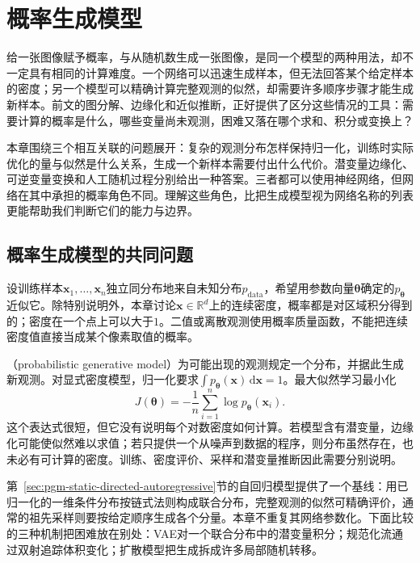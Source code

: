 \chapter{概率生成模型}
\label{chap:pgm-generative}

给一张图像赋予概率，与从随机数生成一张图像，是同一个模型的两种用法，却不一定具有相同的计算难度。一个网络可以迅速生成样本，但无法回答某个给定样本的密度；另一个模型可以精确计算完整观测的似然，却需要许多顺序步骤才能生成新样本。前文的图分解、边缘化和近似推断，正好提供了区分这些情况的工具：需要计算的概率是什么，哪些变量尚未观测，困难又落在哪个求和、积分或变换上？

本章围绕三个相互关联的问题展开：复杂的观测分布怎样保持归一化，训练时实际优化的量与似然是什么关系，生成一个新样本需要付出什么代价。潜变量边缘化、可逆变量变换和人工随机过程分别给出一种答案。三者都可以使用神经网络，但网络在其中承担的概率角色不同。理解这些角色，比把生成模型视为网络名称的列表更能帮助我们判断它们的能力与边界。

\section{概率生成模型的共同问题}
\label{sec:pgm-generative-common}

设训练样本$\bm{x}_1,\ldots,\bm{x}_n$独立同分布地来自未知分布$p_{\mathrm{data}}$，希望用参数向量$\bm{\theta}$确定的$p_{\bm{\theta}}$近似它。除特别说明外，本章讨论$\bm{x}\in\mathbb{R}^{d}$上的连续密度，概率都是对区域积分得到的；密度在一个点上可以大于$1$。二值或离散观测使用概率质量函数，不能把连续密度值直接当成某个像素取值的概率。

（probabilistic generative model）为可能出现的观测规定一个分布，并据此生成新观测。对显式密度模型，归一化要求$\int p_{\bm{\theta}}(\bm{x})\,\mathrm{d}\bm{x}=1$。最大似然学习最小化
\begin{equation}
  \label{eq:pgm-generative-nll}
  J(\bm{\theta})
  =-\frac{1}{n}\sum_{i=1}^{n}\log p_{\bm{\theta}}(\bm{x}_i).
\end{equation}
这个表达式很短，但它没有说明每个对数密度如何计算。若模型含有潜变量，边缘化可能使似然难以求值；若只提供一个从噪声到数据的程序，则分布虽然存在，也未必有可计算的密度。训练、密度评价、采样和潜变量推断因此需要分别说明。

第~\ref{sec:pgm-static-directed-autoregressive}节的自回归模型提供了一个基线：用已归一化的一维条件分布按链式法则构成联合分布，完整观测的似然可精确评价，通常的祖先采样则要按给定顺序生成各个分量。本章不重复其网络参数化。下面比较的三种机制把困难放在别处：VAE对一个联合分布中的潜变量积分；规范化流通过双射追踪体积变化；扩散模型把生成拆成许多局部随机转移。

